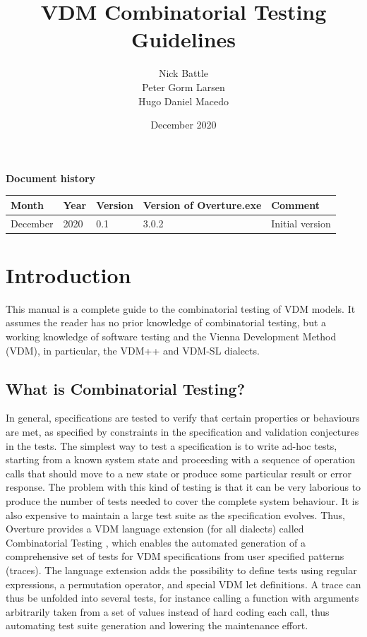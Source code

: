 \documentclass{overturerepchap}
\begin{document}
\title{VDM Combinatorial Testing Guidelines}
\author{Nick Battle\\
            Peter Gorm Larsen\\
        Hugo Daniel Macedo}

\date{December 2020}

\maketitle


{\textbf{Document history}}

\begin{tabular}{|l|l|l|l|l|}\hline
Month   & Year & Version & Version of Overture.exe & Comment \\ \hline
December   & 2020 &    0.1     & 3.0.2   & Initial version\\ \hline
\end{tabular}

\tableofcontents
\newpage
\mbox{}
\newpage
{}
\setcounter{page}{1}

\chapter{Introduction}

This manual is a complete guide to the combinatorial testing of VDM models. It
assumes the reader has no prior knowledge of combinatorial testing, but a
working knowledge of software testing and the Vienna Development Method (VDM),
in particular, the VDM++ and VDM-SL dialects.

\section{What is Combinatorial Testing?}

In general, specifications are tested to verify that certain properties or
behaviours are met, as specified by constraints in the specification and
validation conjectures in the tests. 
%
The simplest way to test a specification is to write ad-hoc tests, starting
from a known system state and proceeding with a sequence of operation calls
that should move to a new state or produce some particular result or error
response.  The problem with this kind of testing is that it can be very
laborious to produce the number of tests needed to cover the complete system
behaviour. It is also expensive to maintain a large test suite as the
specification evolves. Thus, Overture provides a VDM language extension (for
all dialects) called Combinatorial Testing \cite{Nie&11,Larsen&10c}, which
enables the automated generation of a comprehensive set of tests for VDM
specifications from user specified patterns (traces). The language extension
adds the possibility to define tests using regular expressions, a permutation
operator, and special VDM let definitions. A trace
can thus be unfolded into several tests, for instance calling a function with arguments
arbitrarily taken from a set of values instead of hard coding each call, thus
automating test suite generation and lowering the maintenance effort.
\end{document}
